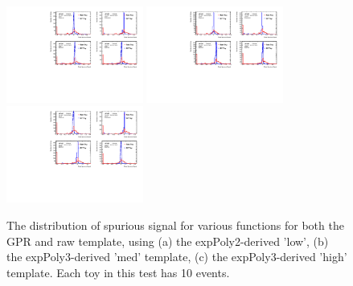 \begin{figure} 
\begin{center}
  \includegraphics[width=0.4\textwidth]{figures/background/gpr/validation/nominal/ToyTest_FitSigVals_lowpT_10_noSig}   
  \includegraphics[width=0.4\textwidth]{figures/background/gpr/validation/nominal/ToyTest_FitSigVals_medpT_10_noSig}   
  \includegraphics[width=0.4\textwidth]{figures/background/gpr/validation/nominal/ToyTest_FitSigVals_highpT_10_noSig}   
\caption{The distribution of spurious signal for various functions for both the GPR and raw template, using (a) the expPoly2-derived 'low', (b) the expPoly3-derived 'med' template, (c) the expPoly3-derived 'high' template. Each toy in this test has 10 events.}
\label{fig:lowpt_10_noSig}
\end{center}
\end{figure}

